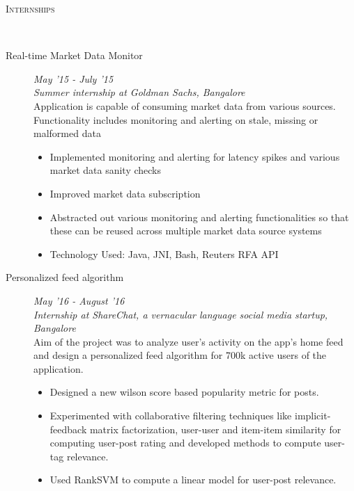\documentclass[9pt]{article}
\newenvironment{changemargin}[2]{%
  \begin{list}{}{%
    \setlength{\topsep}{0pt}%
    \setlength{\leftmargin}{#1}%
    \setlength{\rightmargin}{#2}%
    \setlength{\listparindent}{\parindent}%
    \setlength{\itemindent}{\parindent}%
    \setlength{\parsep}{\parskip}%
  }%
  \item[]}{\end{list}
}
\newcommand{\lineover}{
	\begin{changemargin}{-0.05in}{-0.10in}
		\vspace*{-9pt}
		\hrulefill \\
		\vspace*{-2pt}
	\end{changemargin}
}
\newcommand{\header}[1]{
	\begin{changemargin}{-0.5in}{-0.5in}
		\scshape{#1}\\
  	\lineover
	\end{changemargin}
}
\newenvironment{body} {
	\vspace*{-16pt}
	\begin{changemargin}{-0.6in}{-0.65in}
  }	
	{\end{changemargin}
}
\begin{document}
\header{Internships}
\begin{body}
 \vspace{14pt}
  \begin{description}
  \item[\normalsize{Real-time Market Data Monitor}] \hfill \textit{May '15 - July '15} \\
  \textit{Summer internship at Goldman Sachs, Bangalore} \\
  Application is capable of consuming market data from various sources. 
  Functionality includes monitoring and alerting on stale, missing or malformed data
  \begin{itemize}
   \item Implemented monitoring and alerting for latency spikes and various market data sanity checks
   \item Improved market data subscription
   \item Abstracted out various monitoring and alerting functionalities so that these can be reused across multiple market data source systems
   \item Technology Used: Java, JNI, Bash, Reuters RFA API
  \end{itemize}
  \end{description}

 \begin{description}
   \item [\normalsize{Personalized feed algorithm}] \hfill \textit{May '16 - August '16} \\
   \textit{Internship at ShareChat, a vernacular language social media startup, Bangalore} \\
    Aim of the project was to analyze user's activity on the app's home feed and design 
    a personalized feed algorithm for 700k active users of the application.
    \begin{itemize}
     \item Designed a new wilson score based popularity metric for posts.  \\ 
     \item Experimented with collaborative filtering techniques like implicit-feedback matrix factorization, user-user and item-item similarity
	   for computing user-post rating and developed methods to compute user-tag relevance.
     \item Used RankSVM to compute a linear model for user-post relevance.
    \end{itemize}
  \end{description}
  
\end{body}
\end{document}
